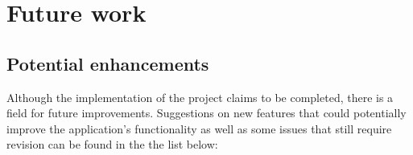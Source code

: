 

%


\section{Future work}
\label{sec:ch8_future_work}

\subsection{Potential enhancements}

Although the implementation of the project claims to be completed, there is a field for future improvements. Suggestions on new features that could potentially improve the application\rq{}s functionality as well as some issues that still require revision can be found in the the list below:

